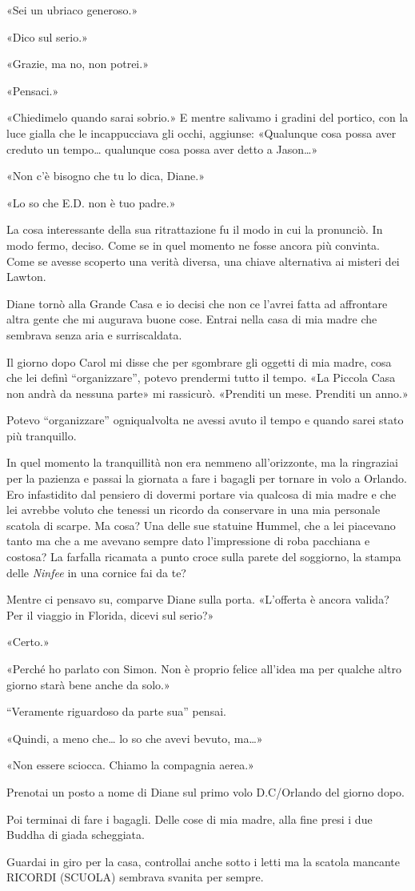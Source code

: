«Sei un ubriaco generoso.»

«Dico sul serio.»

«Grazie, ma no, non potrei.»

«Pensaci.»

«Chiedimelo quando sarai sobrio.» E mentre salivamo i gradini del
portico, con la luce gialla che le incappucciava gli occhi, aggiunse:
«Qualunque cosa possa aver creduto un tempo\ldots{} qualunque cosa possa
aver detto a Jason\ldots»

«Non c'è bisogno che tu lo dica, Diane.»

«Lo so che E.D. non è tuo padre.»

La cosa interessante della sua ritrattazione fu il modo in cui la
pronunciò. In modo fermo, deciso. Come se in quel momento ne fosse
ancora più convinta. Come se avesse scoperto una verità diversa, una
chiave alternativa ai misteri dei Lawton.

\separatorefiori

Diane tornò alla Grande Casa e io decisi che non ce l'avrei fatta ad
affrontare altra gente che mi augurava buone cose. Entrai nella casa di
mia madre che sembrava senza aria e surriscaldata.

Il giorno dopo Carol mi disse che per sgombrare gli oggetti di mia
madre, cosa che lei definì ``organizzare'', potevo prendermi tutto il
tempo. «La Piccola Casa non andrà da nessuna parte» mi rassicurò.
«Prenditi un mese. Prenditi un anno.»

Potevo ``organizzare'' ogniqualvolta ne avessi avuto il tempo e quando
sarei stato più tranquillo.

In quel momento la tranquillità non era nemmeno all'orizzonte, ma la
ringraziai per la pazienza e passai la giornata a fare i bagagli per
tornare in volo a Orlando. Ero infastidito dal pensiero di dovermi
portare via qualcosa di mia madre e che lei avrebbe voluto che tenessi
un ricordo da conservare in una mia personale scatola di scarpe. Ma
cosa? Una delle sue statuine Hummel, che a lei piacevano tanto ma che a
me avevano sempre dato l'impressione di roba pacchiana e costosa? La
farfalla ricamata a punto croce sulla parete del soggiorno, la stampa
delle \emph{Ninfee} in una cornice fai da te?

Mentre ci pensavo su, comparve Diane sulla porta. «L'offerta è ancora
valida? Per il viaggio in Florida, dicevi sul serio?»

«Certo.»

«Perché ho parlato con Simon. Non è proprio felice all'idea ma per
qualche altro giorno starà bene anche da solo.»

``Veramente riguardoso da parte sua'' pensai.

«Quindi, a meno che\ldots{} lo so che avevi bevuto, ma\ldots»

«Non essere sciocca. Chiamo la compagnia aerea.»

Prenotai un posto a nome di Diane sul primo volo D.C/Orlando del giorno
dopo.

Poi terminai di fare i bagagli. Delle cose di mia madre, alla fine presi
i due Buddha di giada scheggiata.

Guardai in giro per la casa, controllai anche sotto i letti ma la
scatola mancante {RICORDI} ({SCUOLA}) sembrava svanita per sempre.
